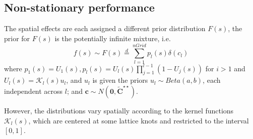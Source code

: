 \documentclass[
12pt, %
a4paper, %
oneside, %
headinclude,footinclude, %
BCOR5mm, %
]{scrartcl}
\begin{document}
\subsection{Non-stationary performance}
The spatial effects are each assigned a different prior distribution $F(s)$, the prior for $F(s)$ is the potentially infinite mixture, i.e. 
$$f(s) \sim F(s) \overset{d}{=} \sum_{l = 1}^{nGrid}p_l(s)\delta(c_l)$$ 
where $p_1(s) = U_1(s), p_l(s) = U_l(s)\prod_{j = 1}^{l - 1}\left(1 - U_j(s)\right)$ for $i >1$ and $U_l(s) = \mathcal{K}_l(s)u_l$, and $u_l$ is given the priors $u_l \sim Beta(a, b)$, each independent across $l$; and $\boldsymbol{c} \sim N(\boldsymbol{0}, \boldsymbol{\tilde{C}}^{\star\star})$.

 However, the distributions vary spatially according to the kernel functions $\mathcal{K}_l(s)$, which are  centered at some lattice knots and restricted to the interval $[0,1]$.

%

\end{document}
